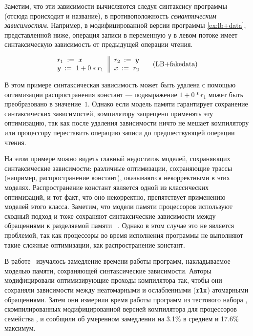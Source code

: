 Заметим, что эти зависимости вычисляются следуя 
синтаксису программы (отсюда происходит и название), 
в противоположность \emph{семантическим зависимостям}. 
Например, в модифицированной версии 
программы \ref{ex:lb+data}, представленной ниже, 
операция записи в переменную \texttt{y} в левом потоке имеет синтаксическую зависимость от предыдущей операции чтения. 

\begin{equation*}
\inarrII{
  \readInst{}{r_1}{x}           \\
  \writeInst{}{y}{1 + 0 * r_1}  \\
}{
  \readInst{}{r_2}{y}      \\
  \writeInst{}{x}{r_2}     \\
}
\tag{LB+fakedata}\label{ex:lb+fakedata}
\end{equation*}

В этом примере синтаксическая зависимость может быть удалена
с помощью оптимизации распространения констант ---
подвыражение ${1 + 0 * r_1}$ может быть преобразовано в значение~$1$.
Однако если модель памяти гарантирует сохранение синтаксических зависимостей,
компилятору запрещено применять эту оптимизацию, 
так как после удаления зависимости ничто не мешает компилятору или процессору 
переставить операцию записи до предшествующей операции чтения.  

На этом примере можно видеть главный недостаток моделей, 
сохраняющих синтаксические зависимости: 
различные оптимизации, сохраняющие трассы
(например, распространение констант), оказываются некорректными в этих моделях. 
Распространение констант является одной из 
классических оптимизаций, и тот факт, 
что оно некорректно, препятствует применению моделей этого класса. 
Заметим, что модели памяти процессоров 
используют сходный подход и тоже 
сохраняют синтаксические зависимости 
между обращениями к разделяемой памяти%
~\cite{Sarkar-al:PLDI11, Alglave-al:TOPLAS14, Pulte-al:POPL18}.
Однако в этом случае это не является проблемой, 
так как процессоры во время исполнения программы 
не выполняют такие сложные оптимизации, 
как распространение констант.

В работе~\cite{Ou-Demsky:OOPSLA18} изучалось 
замедление времени работы программ, накладываемое моделью памяти, 
сохраняющей синтаксические зависимости. 
Авторы модифицировали оптимизирующие проходы компилятора так, 
чтобы они сохраняли зависимости между 
неатомарными и ослабленными ($\mathtt{rlx}$) атомарными обращениями. 
Затем они измерили время работы программ из тестового набора \SPECCPU,
скомпилированных модифицированной версией компилятора \LLVM 
для процессоров семейства , и сообщили 
об умеренном замедлении на 3.1\% в среднем и 17.6\% максимум.

